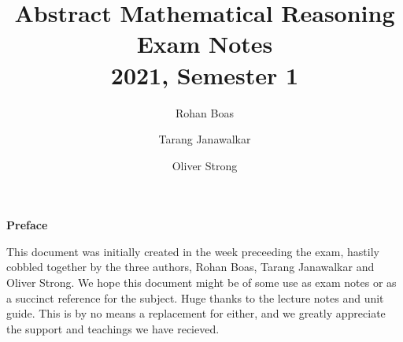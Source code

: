 \documentclass{article}
\title{\textbf{Abstract Mathematical Reasoning}
    \texorpdfstring{\\}{ } {\large Exam Notes}
    \texorpdfstring{\\}{ } {\normalsize 2021, Semester 1}}
\author{
    Rohan Boas \and Tarang Janawalkar \and Oliver Strong
}
\date{}
\theoremstyle{plain}
\numberwithin{theorem}{subsection}
\theoremstyle{definition}
\numberwithin{definition}{subsection}
\theoremstyle{remark}
\numberwithin{note}{subsection}
\begin{document}
\begin{titlepage}
\maketitle
\thispagestyle{empty}
\vfill
\begin{adjustwidth}{4cm}{4cm}
{\Large\bf Preface}
\vspace{0.7em}

This document was initially created in the week preceeding the exam,
hastily cobbled together by the three authors, Rohan Boas, Tarang Janawalkar and Oliver Strong.
We hope this document might be of some use as
exam notes or as a succinct reference for the subject.
Huge thanks to the lecture notes and unit guide.
This is by no means a replacement for either,
and we greatly appreciate the support and teachings we have recieved.
\end{adjustwidth}
\vfill
\begin{adjustwidth}{5cm}{5cm}
\doclicenseThis
\end{adjustwidth}
\vfill
\end{titlepage}

\newpage
\end{document}
